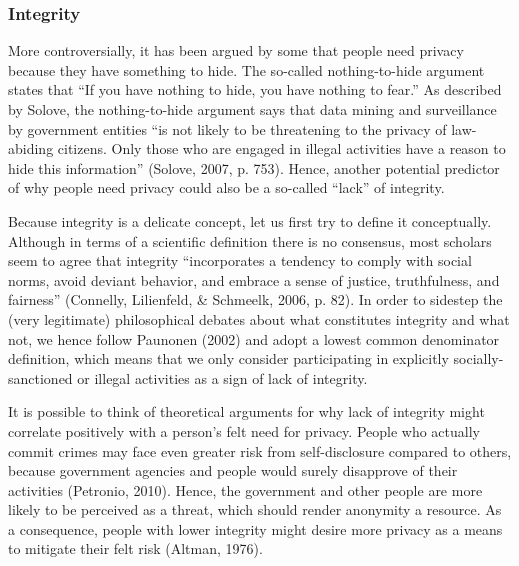 \documentclass[man,floatsintext]{apa6}
\begin{document}
\hypertarget{integrity}{%
\subsubsection{Integrity}\label{integrity}}

More controversially, it has been argued by some that people need privacy because they have something to hide. The so-called nothing-to-hide argument states that \enquote{If you have nothing to hide, you have nothing to fear.} As described by Solove, the nothing-to-hide argument says that data mining and surveillance by government entities \enquote{is not likely to be threatening to the privacy of law-abiding citizens. Only those who are engaged in illegal activities have a reason to hide this information} (Solove, 2007, p. 753). Hence, another potential predictor of why people need privacy could also be a so-called \enquote{lack} of integrity.

Because integrity is a delicate concept, let us first try to define it conceptually. Although in terms of a scientific definition there is no consensus, most scholars seem to agree that integrity \enquote{incorporates a tendency to comply with social norms, avoid deviant behavior, and embrace a sense of justice, truthfulness, and fairness} (Connelly, Lilienfeld, \& Schmeelk, 2006, p. 82). In order to sidestep the (very legitimate) philosophical debates about what constitutes integrity and what not, we hence follow Paunonen (2002) and adopt a lowest common denominator definition, which means that we only consider participating in explicitly socially-sanctioned or illegal activities as a sign of lack of integrity.

It is possible to think of theoretical arguments for why lack of integrity might correlate positively with a person's felt need for privacy. People who actually commit crimes may face even greater risk from self-disclosure compared to others, because government agencies and people would surely disapprove of their activities (Petronio, 2010). Hence, the government and other people are more likely to be perceived as a threat, which should render anonymity a resource. As a consequence, people with lower integrity might desire more privacy as a means to mitigate their felt risk (Altman, 1976).
\end{document}
